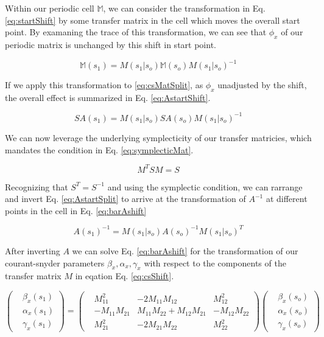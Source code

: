 Within our periodic cell $\mathbb{M}$, we can consider the transformation in Eq. \ref{eq:startShift} by some transfer matrix in the cell which moves the overall start point. By examaning the trace of this transformation, we can see that $\phi_x$ of our periodic matrix is unchanged by this shift in start point.

\begin{equation} \label{eq:startShift}
	\mathbb{M}(s_1)  = M(s_1|s_o)\mathbb{M}(s_o)M(s_1|s_o)^{-1}
\end{equation}

If we apply this transformation to \ref{eq:csMatSplit}, as $\phi_x$ unadjusted by the shift, the overall effect is summarized in Eq. \ref{eq:AstartShift}.

\begin{equation} \label{eq:AstartShift}
	S A(s_1) = M(s_1|s_o) S A(s_o)M(s_1|s_o)^{-1}
\end{equation}

We can now leverage the underlying symplecticity of our transfer matricies, which mandates the condition in Eq. \ref{eq:symplecticMat}.

\begin{equation} \label{eq:symplecticMat}
	M^T S M = S
\end{equation}

Recognizing that $S^T = S^{-1}$ and using the symplectic condition, we can rarrange and invert Eq. \ref{eq:AstartSplit} to arrive at the transformation of $A^{-1}$ at different points in the cell in Eq. \ref{eq:barAshift} 

\begin{equation} \label{eq:barAshift}
	A(s_1)^{-1} = M(s_1|s_o)  A(s_o)^{-1} M(s_1|s_o)^T
\end{equation}

After inverting $A$ we can solve Eq. \ref{eq:barAshift} for the transformation of our courant-snyder parameters $\beta_x, \alpha_x, \gamma_x$ with respect to the components of the transfer matrix $M$ in eqation Eq. \ref{eq:csShift}.

\begin{equation} \label{eq:csShift}
	\begin{pmatrix} &\beta_x(s_1) \\ &\alpha_x(s_1)\\ &\gamma_x(s_1) \end{pmatrix} = 
	\begin{pmatrix}
		&M_{11}^2 &-2 M_{11} M_{12} &M_{12}^2\\
		&-M_{11} M_{21} &M_{11} M_{22} + M_{12} M_{21} &-M_{12}M_{22}\\
		&M_{21}^2 &-2 M_{21} M_{22} &M_{22}^2
	\end{pmatrix}
	\begin{pmatrix} &\beta_x(s_o) \\ &\alpha_x(s_o)\\ &\gamma_x(s_o) \end{pmatrix}
\end{equation}

